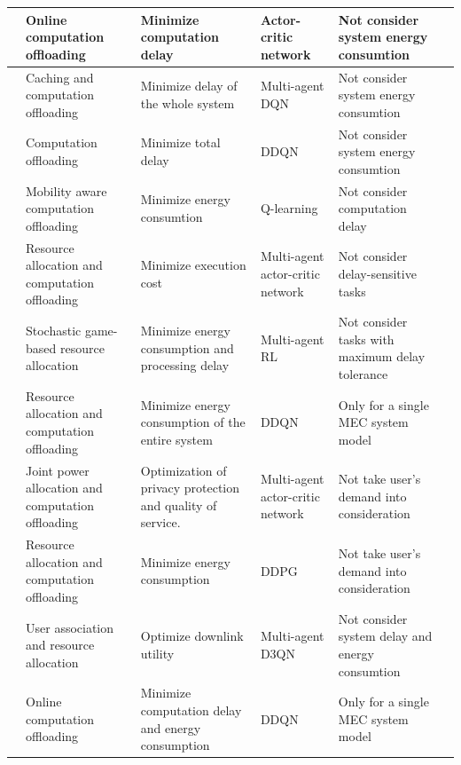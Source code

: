 \documentclass[12pt,draftclsnofoot,onecolumn]{IEEEtran}
\newenvironment{my}[2]%
{\begin{list}{}%
{\setlength{\rightmargin}{#1}\setlength{\leftmargin}{#2}}%


 \item[]{}

} {\end{list}}
\begin{document}
\begin{enumerate}
\begin{my}{1cm}{1cm}
{\begin{table}[tbp]
{{\begin{tabular}{ lp{7cm}p{6cm}p{4cm}p{6cm}l}
						\cite{li2022integrated} & Online computation offloading & Minimize computation delay & Actor-critic network & Not consider system energy consumtion \\ \midrule
						\cite{li2020joint} & Caching and computation offloading & Minimize delay of the whole system &  Multi-agent DQN & Not consider system energy consumtion \\ \midrule
						\cite{tang2022double}  & Computation offloading & Minimize total delay & DDQN & Not consider system energy consumtion \\ \midrule
						\cite{wang2020reinforcement} & Mobility aware computation offloading & Minimize energy consumtion & Q-learning & Not consider computation delay\\ \midrule
						\cite{liu2021learn}  & Resource allocation and computation offloading & Minimize execution cost  & Multi-agent actor-critic network &  Not consider delay-sensitive tasks \\\midrule
						\cite{wu2023computation}   & Stochastic game-based resource allocation & Minimize energy consumption and processing delay & Multi-agent RL & Not consider tasks with maximum delay tolerance\\\midrule
						\cite{zhou2021deep} & Resource allocation and computation offloading & Minimize energy consumption of the entire system & DDQN & Only for a single MEC system model \\\midrule				
						\cite{wu2024privacy} & Joint power allocation and computation offloading  & Optimization of privacy protection and quality of service.  & Multi-agent actor-critic network& Not take user's demand into consideration \\\midrule
						\cite{dai2020edge} & Resource allocation and computation offloading & Minimize energy consumption & DDPG & Not take user's demand into consideration \\\midrule
						\cite{zhao2019deep} & User association and resource allocation & Optimize downlink utility  & Multi-agent D3QN & Not consider system delay and energy consumtion \\\midrule
						\cite{liao2023online}  & Online computation offloading & Minimize computation delay and energy consumption & DDQN & Only for a single MEC system model  \\\midrule

\end{tabular}}}
\end{table}}
\end{my}
\end{enumerate}
\end{document}
